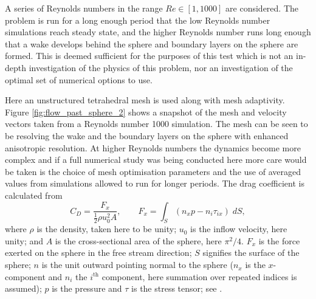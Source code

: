A series of Reynolds numbers in the range
$Re\in [1,1000]$ are considered. The problem is run for a long enough
period that the low Reynolds number simulations reach steady state, and the
higher Reynolds number runs long enough that a wake develops behind the
sphere and boundary layers on the sphere are formed.  This is deemed
sufficient for the purposes of this test which is not an in-depth
investigation of the physics of this problem, nor an investigation of the optimal
set of numerical options to use. 

Here an unstructured
tetrahedral mesh is used along with mesh adaptivity. 
Figure \ref{fig:flow_past_sphere_2} shows a snapshot of the
mesh and velocity vectors taken from a Reynolds number 1000 simulation. The
mesh can be seen to be resolving the wake and the boundary layers on the
sphere with enhanced anisotropic resolution. At higher Reynolds numbers the
dynamics become more complex and if a full numerical study was being
conducted here more care would be taken is the choice of mesh optimisation
parameters and the use of averaged values from simulations allowed to run
for longer periods. The drag coefficient is calculated from
\begin{equation}
C_D = \frac{F_x}{\frac{1}{2}\rho u_0^2 A},\qquad F_x = \int_S (n_xp - n_i\tau_{ix})\;dS,
\label{eqn:drag_coeff}
\end{equation}
where $\rho$ is the density, taken here to be unity; 
$u_0$ is the inflow velocity, here unity; 
and $A$ is the cross-sectional area of the sphere, here $\pi^2/4$. 
$F_x$ is the force 
exerted on the sphere in the free stream direction;
$S$ signifies the surface of the sphere; $n$ is the 
unit outward pointing normal to the sphere 
($n_x$ is the $x$-component and $n_i$ the $i^{\textrm{th}}$ 
component, here summation over repeated indices is assumed); 
$p$ is the pressure and $\tau$ is the stress tensor;
see \citet{panton2006}.

